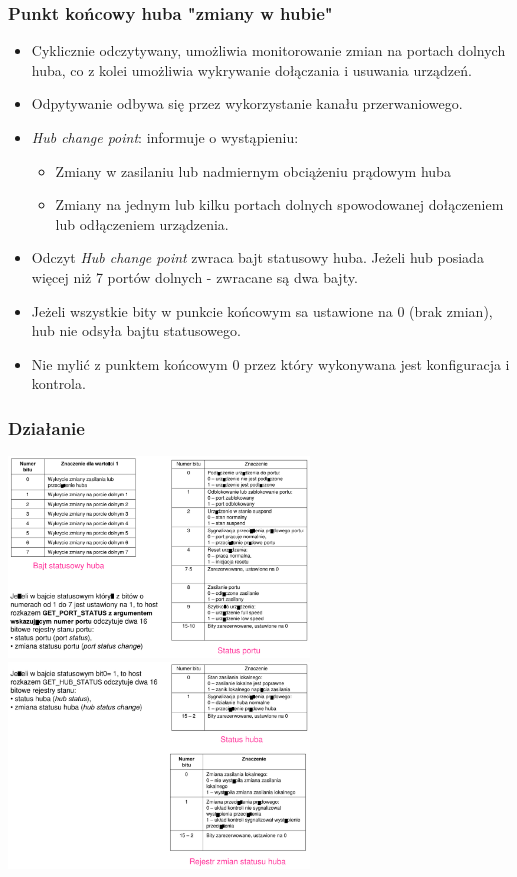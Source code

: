 	\subsubsection{Punkt końcowy huba "zmiany w hubie"}
	\begin{itemize}
		\item Cyklicznie odczytywany, umożliwia monitorowanie zmian na portach dolnych huba, co z kolei umożliwia wykrywanie dołączania i usuwania urządzeń.
		\item Odpytywanie odbywa się przez wykorzystanie kanału przerwaniowego.
		\item \emph{Hub change point}: informuje o wystąpieniu:
		\begin{itemize}
			\item Zmiany w zasilaniu lub nadmiernym obciążeniu prądowym huba
			\item Zmiany na jednym lub kilku portach dolnych spowodowanej dołączeniem lub odłączeniem urządzenia.
		\end{itemize}
		\item Odczyt \emph{Hub change point} zwraca bajt statusowy huba. Jeżeli hub posiada więcej niż 7 portów dolnych - zwracane są dwa bajty.
		\item Jeżeli wszystkie bity w punkcie końcowym sa ustawione na 0 (brak zmian), hub nie odsyła bajtu statusowego.
		\item Nie mylić z punktem końcowym 0 przez który wykonywana jest konfiguracja i kontrola.
	\end{itemize}
	\subsubsection{Działanie}
	\includegraphics[width=8cm]{./wyklady/USB_35_1.pdf}
	\includegraphics[width=8cm]{./wyklady/USB_36_1.pdf}
	

